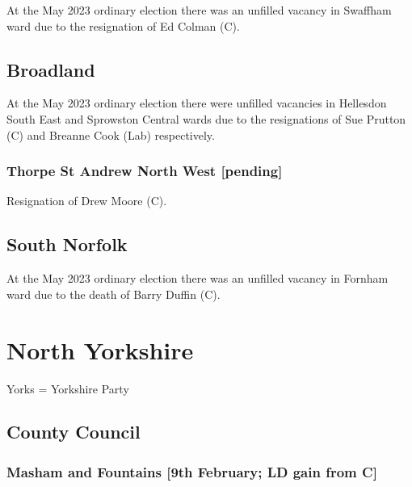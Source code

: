 \documentclass[a4paper,openany]{book}
\begin{document}
\begin{resultsiii}
At the May 2023 ordinary election there was an unfilled vacancy in Swaffham ward due to the resignation of Ed Colman (C).%

\subsection*{Broadland}

At the May 2023 ordinary election there were unfilled vacancies in Hellesdon South East and Sprowston Central wards due to the resignations of Sue Prutton (C) and Breanne Cook (Lab) respectively.%
%

\subsubsection*{Thorpe St Andrew North West \hspace*{\fill}\nolinebreak[1]%
	\enspace\hspace*{\fill}
	[pending]}


Resignation of Drew Moore (C).

\subsection*{South Norfolk}

At the May 2023 ordinary election there was an unfilled vacancy in Fornham ward due to the death of Barry Duffin (C).%

\section{North Yorkshire}

Yorks = Yorkshire Party

\subsection*{County Council}

\subsubsection*{Masham and Fountains \hspace*{\fill}\nolinebreak[1]%
	\enspace\hspace*{\fill}
	[9th February; LD gain from C]}


\end{resultsiii}
\end{document}
